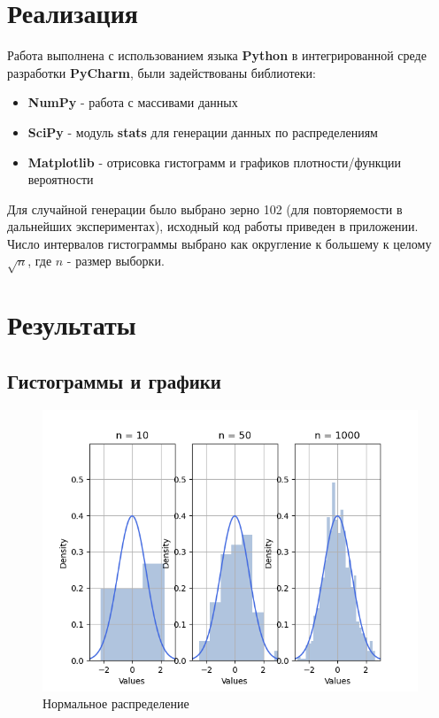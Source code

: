 \documentclass[12pt,a4paper]{article}
\begin{document}
\section{Реализация}
Работа выполнена с использованием языка \textbf{Python} в интегрированной среде разработки \textbf{PyCharm}, были задействованы библиотеки:

\begin{itemize}
	\item \textbf{NumPy} - работа с массивами данных
	\item \textbf{SciPy} - модуль \textbf{stats} для генерации данных по распределениям
	\item \textbf{Matplotlib} - отрисовка гистограмм и графиков плотности/функции вероятности
\end{itemize}

Для случайной генерации было выбрано зерно 102 (для повторяемости в дальнейших экспериментах), исходный код работы приведен в приложении. Число интервалов гистограммы выбрано как округление к большему к целому $\sqrt{n}$, где $n$ - размер выборки.
\pagebreak

\section{Результаты}
\subsection{Гистограммы и графики}
\begin{figure}[h!]
	\centering
	\includegraphics[scale=0.8]{normal.png}
	\caption{Нормальное распределение}
	\label{fig:image}
\end{figure}
\end{document}
